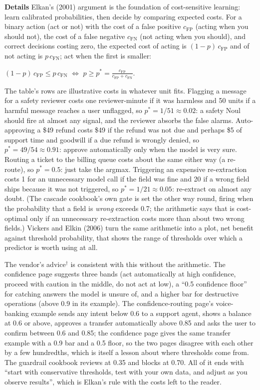 \documentclass[11pt,letterpaper]{article}
\newcommand{\para}[1]{\medskip\noindent\textbf{#1}\quad}
\newenvironment{formulas}{\begin{tcolorbox}[formulabox]}{\end{tcolorbox}}
\begin{document}
\para{Details} Elkan's (2001) argument is the foundation of cost-sensitive learning: learn calibrated probabilities, then decide by comparing expected costs. For a binary action (act or not) with the cost of a false positive $c_{\mathrm{FP}}$ (acting when you should not), the cost of a false negative $c_{\mathrm{FN}}$ (not acting when you should), and correct decisions costing zero, the expected cost of acting is $(1-p)\,c_{\mathrm{FP}}$ and of not acting is $p\,c_{\mathrm{FN}}$; act when the first is smaller:
\begin{formulas}
$(1-p)\,c_{\mathrm{FP}}\leq p\,c_{\mathrm{FN}}$ \quad $\Longleftrightarrow$ \quad $\displaystyle p\geq p^{*}=\frac{c_{\mathrm{FP}}}{c_{\mathrm{FP}}+c_{\mathrm{FN}}}$.
\end{formulas}
The table's rows are illustrative costs in whatever unit fits. Flagging a message for a safety reviewer costs one reviewer-minute if it was harmless and 50 units if a harmful message reaches a user unflagged, so $p^{*}=1/51\approx0.02$: a safety Noul should fire at almost any signal, and the reviewer absorbs the false alarms. Auto-approving a \$49 refund costs \$49 if the refund was not due and perhaps \$5 of support time and goodwill if a due refund is wrongly denied, so $p^{*}=49/54\approx0.91$: approve automatically only when the model is very sure. Routing a ticket to the billing queue costs about the same either way (a re-route), so $p^{*}=0.5$: just take the argmax. Triggering an expensive re-extraction costs 1 for an unnecessary model call if the field was fine and 20 if a wrong field ships because it was not triggered, so $p^{*}=1/21\approx0.05$: re-extract on almost any doubt. (The cascade cookbook's own gate is set the other way round, firing when the probability that a field is \emph{wrong} exceeds 0.7; the arithmetic says that is cost-optimal only if an unnecessary re-extraction costs more than about two wrong fields.) Vickers and Elkin (2006) turn the same arithmetic into a plot, net benefit against threshold probability, that shows the range of thresholds over which a predictor is worth using at all.

The vendor's advice$^\dagger$ is consistent with this without the arithmetic. The confidence page suggests three bands (act automatically at high confidence, proceed with caution in the middle, do not act at low), a ``0.5 confidence floor'' for catching answers the model is unsure of, and a higher bar for destructive operations (above 0.9 in its example). The confidence-routing page's voice-banking example sends any intent below 0.6 to a support agent, shows a balance at 0.6 or above, approves a transfer automatically above 0.85 and asks the user to confirm between 0.6 and 0.85; the confidence page gives the same transfer example with a 0.9 bar and a 0.5 floor, so the two pages disagree with each other by a few hundredths, which is itself a lesson about where thresholds come from. The guardrail cookbook reviews at 0.35 and blocks at 0.70. All of it ends with ``start with conservative thresholds, test with your own data, and adjust as you observe results'', which is Elkan's rule with the costs left to the reader.
\end{document}
